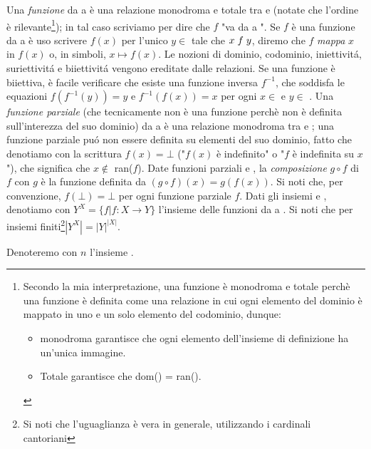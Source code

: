 Una \textit{funzione} da  a  è una relazione monodroma e totale tra  e  (notate che l'ordine è rilevante\footnote{Secondo la mia interpretazione, una funzione è monodroma e totale perchè una funzione è definita come una relazione in cui ogni elemento del dominio è mappato in uno e un solo elemento del codominio, dunque:
\begin{itemize}
    \item monodroma garantisce che ogni elemento dell'insieme di definizione ha un'unica immagine.
    \item Totale garantisce che dom() = ran().
\end{itemize}}); in tal caso scriviamo  per dire che $f$ "va da  a ". Se $f$ è una funzione da  a  è uso scrivere $f(x)$ per l'unico $y \in$  tale che $x \hspace{1mm} f \hspace{1mm} y$, diremo che $f$ \textit{mappa} $x$ in $f(x)$ o, in simboli, $x \mapsto f(x)$. Le nozioni di dominio, codominio, iniettivitá, suriettivitá e biiettivitá vengono ereditate dalle relazioni. Se una funzione  è biiettiva, è facile verificare che esiste una funzione inversa $f^{-1}$, che soddisfa le equazioni $f(f^{-1}(y)) = y$ e $f^{-1}(f(x)) = x$ per ogni $x \in$  e $y \in$ . Una \textit{funzione parziale} (che tecnicamente non è una funzione perchè non è definita sull'interezza del suo dominio) da  a  è una relazione monodroma tra  e ; una funzione parziale puó non essere definita su elementi del suo dominio, fatto che denotiamo con la scrittura $f(x) = \bot$ ("$f(x)$ è indefinito" o "$f$ è indefinita su $x$"), che significa che $x \notin$ ran($f$). Date funzioni parziali  e , la \textit{composizione} $g \circ f$ di $f$ con $g$ è la funzione definita da $(g \circ f)(x) = g(f(x))$. Si noti che, per convenzione, $f(\bot) = \bot$ per ogni funzione parziale $f$. Dati gli insiemi  e , denotiamo con $Y^X = \{f | f : X \rightarrow Y\}$ l'insieme delle funzioni da  a . Si noti che per insiemi finiti\footnote{Si noti che l'uguaglianza è vera in generale, utilizzando i cardinali cantoriani}$|Y^X| = |Y|^{|X|}$.

Denoteremo con $n$ l'insieme .

